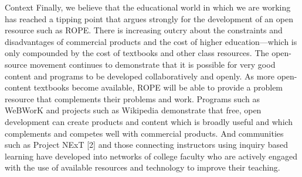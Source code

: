 \documentclass[11pt]{article}
\begin{document}
\begin{section}{Context}
Finally, we believe that the educational world in which we are working has
reached a tipping point that argues strongly for the development of an open
resource such as ROPE.  There is increasing outcry about the constraints
and disadvantages of commercial products and the cost of higher
education---which is only compounded by the cost of textbooks and other
class resources.  The open-source movement continues to demonstrate that
it is possible for very good content and programs to be
developed collaboratively and openly.  %
As more
open-content textbooks become available, ROPE will be able to provide a
problem resource that complements their problems and work.  Programs such
as WeBWorK and projects such as Wikipedia demonstrate that free, open
development can create products and content which is broadly useful and
which complements and competes well with commercial products.  And
communities such as Project NExT [2] and those connecting instructors
using inquiry based learning have developed into networks of
college faculty who are actively engaged with the use of available
resources and technology to improve their teaching.

\end{section}
\end{document}
